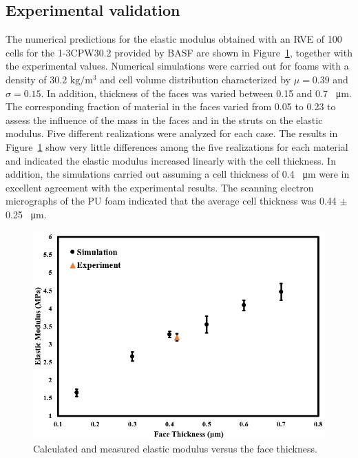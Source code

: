 \documentclass[review]{elsarticle}
\begin{document}
\subsection{Experimental validation}

The numerical predictions for the elastic modulus obtained with an RVE of 100 cells for the 1-3CPW30.2 provided by BASF are shown in Figure~\ref{fig:CalculatedElastic}, together with the experimental values. Numerical simulations were carried out for foams with a density of 30.2 $\mathrm{kg/m^3}$ and cell volume distribution characterized by $\mu=0.39$  and $\sigma=0.15$. In addition, thickness of the faces was varied between 0.15 and 0.7 \SI{}{\micro\metre}. The corresponding fraction of material in the faces varied from 0.05 to 0.23 to assess the influence of the mass in the faces and in the struts on the elastic modulus. Five different realizations were analyzed for each case. The results in Figure~\ref{fig:CalculatedElastic} show very little differences among the five realizations for each material and indicated the elastic modulus increased linearly with the cell thickness. In addition, the simulations carried out assuming a cell thickness of 0.4 \SI{}{\micro\metre} were in excellent agreement with the experimental results. The scanning electron micrographs of the PU foam indicated that the average cell thickness was 0.44 $\pm$ 0.25 \SI{}{\micro\metre}.

\begin{figure}[hb]
  \centering
  \includegraphics[scale=0.6]{CalculatedElastic}
  \captionsetup{justification=centering}
  \caption[Close up of \textit{Hemidactylus} sp. ]
   {Calculated and measured elastic modulus versus the face thickness.}
  \label{fig:CalculatedElastic}
\end{figure}
\end{document}
